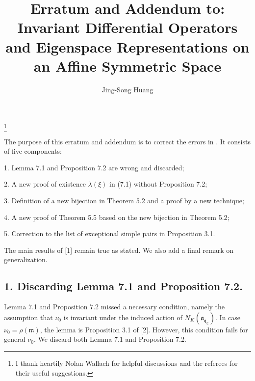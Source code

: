 \documentclass[a4paper]{amsart}
\theoremstyle{plain}
\theoremstyle{definition}
\newcommand{\fra}{\mathfrak{a}}
\newcommand{\frm}{\mathfrak{m}}
\newcommand{\frq}{\mathfrak{q}}
\newcommand{\bbC}{\mathbb{C}}
\begin{document}
\title[Erratum and addendum to: Invariant Differential Operators]{Erratum and Addendum to: Invariant Differential Operators and Eigenspace Representations on an Affine Symmetric Space}


\author{Jing-Song Huang}
\address{Department of Mathematics, Hong Kong University of Science and Technology,
Clear Water Bay, Kowloon, Hong Kong SAR, China}





\thanks{I thank heartily Nolan Wallach for helpful discussions and the referees for their useful suggestions.
}


\maketitle


The purpose of this erratum and addendum is to correct the errors in \cite{H}.  It consists of five components:

1. Lemma 7.1 and Proposition 7.2 are wrong and discarded;

2. A new proof of existence $\lambda(\xi)$ in (7.1) without Proposition 7.2;

3. Definition of a new bijection in Theorem 5.2 and a proof by a new technique;

4. A new proof of Theorem 5.5 based on the new bijection in Theorem 5.2;

5. Correction to the list of exceptional simple pairs in Proposition 3.1.


\noindent The main results of [1] remain true as stated.  We also add a final remark on generalization.

\subsection*{1. Discarding Lemma 7.1 and Proposition 7.2.}
Lemma 7.1 and Proposition 7.2 missed a necessary condition, namely the assumption that $\nu_0$ is invariant
under the induced action of $N_K(\fra_{\frq_\bbC})$.  In case $\nu_0=\rho(\frm)$, the lemma
is Proposition 3.1 of [2].
However, this condition fails for general $\nu_0$.  We discard both Lemma 7.1 and Proposition 7.2.
\end{document}
